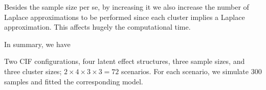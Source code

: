 Besides the sample size per se, by increasing it we also increase the
number of Laplace approximations to be performed since each cluster
implies a Laplace approximation. This affects hugely the computational
time.

In summary, we have

Two CIF configurations, four latent effect structures, three sample
sizes, and three cluster sizes; \(2 \times 4 \times 3 \times 3 = 72\)
scenarios. For each scenario, we simulate 300 samples and fitted the
corresponding model.

